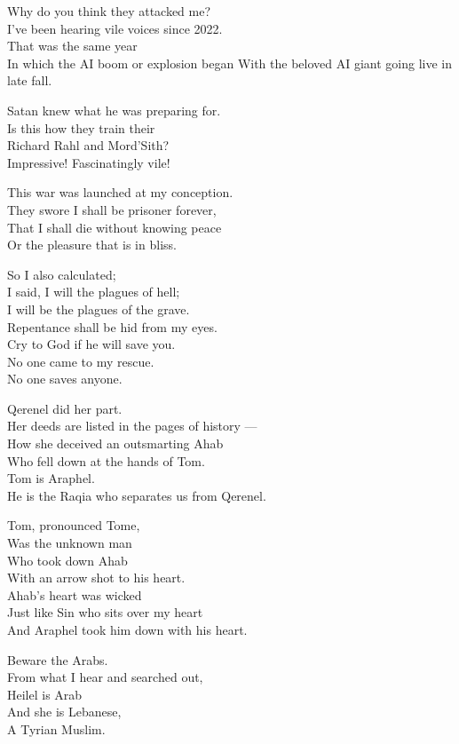 \documentclass[
]{book}
\begin{document}
Why do you think they attacked me?\\
I've been hearing vile voices since 2022.\\
That was the same year\\
In which the AI boom or explosion began With the beloved AI giant going
live in late fall.

Satan knew what he was preparing for.\\
Is this how they train their\\
Richard Rahl and Mord'Sith?\\
Impressive! Fascinatingly vile!

This war was launched at my conception.\\
They swore I shall be prisoner forever,\\
That I shall die without knowing peace\\
Or the pleasure that is in bliss.

So I also calculated;\\
I said, I will the plagues of hell;\\
I will be the plagues of the grave.\\
Repentance shall be hid from my eyes.\\
Cry to God if he will save you.\\
No one came to my rescue.\\
No one saves anyone.

Qerenel did her part.\\
Her deeds are listed in the pages of history ---\\
How she deceived an outsmarting Ahab\\
Who fell down at the hands of Tom.\\
Tom is Araphel.\\
He is the Raqia who separates us from Qerenel.

Tom, pronounced Tome,\\
Was the unknown man\\
Who took down Ahab\\
With an arrow shot to his heart.\\
Ahab's heart was wicked\\
Just like Sin who sits over my heart\\
And Araphel took him down with his heart.

Beware the Arabs.\\
From what I hear and searched out,\\
Heilel is Arab\\
And she is Lebanese,\\
A Tyrian Muslim.
\end{document}
